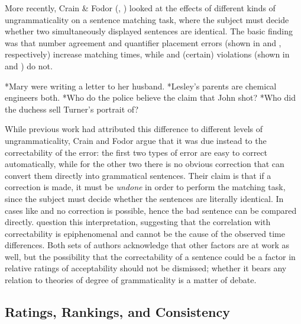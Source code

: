 More recently, Crain \& Fodor (\citeyear{CrainFodor1985}, \citeyear{CrainEtAl1987}) looked at the effects of different
kinds of ungrammaticality on a sentence matching task, where the subject
must decide whether two simultaneously displayed sentences are identical. The basic finding was that number agreement and quantifier placement errors (shown in  and , respectively) increase matching times, while  and (certain)  violations (shown in  and ) do not.

\ea \label{ex:3:9}
*Mary were writing a letter to her husband.
\z
\ea\label{ex:3:10}
 *Lesley's parents are chemical engineers both.
\z
\ea\label{ex:3:11}
 *Who do the police believe the claim that John shot?
\z
\ea\label{ex:3:12}
 *Who did the duchess sell Turner's portrait of?
\z


While previous work had attributed this difference to different levels of ungrammaticality, Crain and Fodor argue that it was due instead to the correctability of the error: the first two types of error are easy to correct automatically, while for the other two there is no obvious correction that can convert them directly into grammatical sentences. Their claim is that if a correction is made, it must be \textit{undone} in order to perform the matching task, since the subject must decide whether the sentences are literally identical. In cases like  and  no correction is possible, hence the bad sentence can be compared directly. \citet{ForsterEtAl1987} question this interpretation, suggesting that the correlation with correctability is epiphenomenal and cannot be the cause of the observed time differences. Both sets of authors acknowledge that other factors are at work as well, but the possibility that the correctability of a sentence could be a factor in relative ratings of acceptability should not be dismissed; whether it bears any relation to theories of degree of grammaticality is a matter of debate.

\subsection{Ratings, Rankings, and Consistency} \label{sec:3.3.4}


